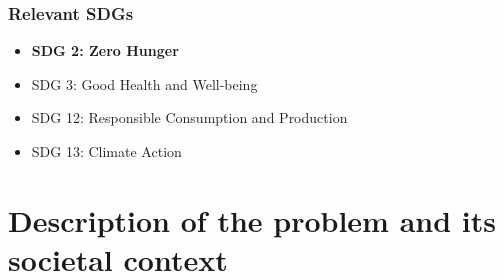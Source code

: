 \documentclass{oqireport}
\begin{document}
\begin{abstract}

 Nutrition and the environment are inextricably linked. Climate change adversely affects yields and nutritional quality of major staple crops, raising the risk of food insecurity and malnutrition. Conversely, our food systems drive an estimated 80\% of deforestation and a third of greenhouse gas emissions. As populations and incomes grow in developing countries, demand for animal-source foods will rise, placing further pressure on meeting climate and biodiversity loss goals. \cite{Fanzo2022, UNFSS_Planet_2023, Sylvester2024}

With the rapid progress in quantum computing, various optimization tasks in industry, energy, and other societal applications may take advantage of these novel methodological opportunities \cite{ajagekar_quantum_2019,abbas_quantum_2023,osaba_hybrid_2024}.

To this purpose, a set of well established ways to convert Mixed Integer Linear Programming (MILP) or Mixed Integer Quadratic Programming (MIQP) optimization problems into Quadratic Binary Unconstrained Optimization (QUBO) problems -- those that are naturally handled by quantum computers and annealers -- is now available \cite{naghmouchi_mixed_2024,franco_efficient_2023,karimi_practical_2019}.

Our goal is to demonstrate the usage of such methods in the resolution of a food optimization problem, showing how they constitute a valid alternative to classical solvers in predefined instances.\cite{karimi_practical_2019,ajagekar_quantum_2020,ajagekar_quantum_2021,chang_hybrid_2022,wang_quantum-inspired_2022,yonaga_quantum_2022,franco_efficient_2023,paterakis_hybrid_2023,ellinas_hybrid_2024,naghmouchi_mixed_2024}.
\end{abstract}

\subsubsection*{Relevant SDGs}
\begin{itemize}
    \item \textbf{SDG 2: Zero Hunger}
    \item SDG 3: Good Health and Well-being
    \item SDG 12: Responsible Consumption and Production
    \item SDG 13: Climate Action
\end{itemize}

\section{Description of the problem and its societal context}
\end{document}
